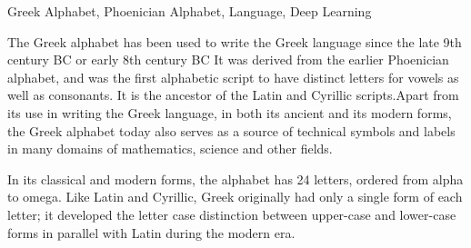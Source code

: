 \documentclass[doctor]{dutthesis} %
\begin{document}
\begin{englishabstract}{Greek Alphabet, Phoenician Alphabet, Language, Deep Learning}

The Greek alphabet has been used to write the Greek language since the late 9th
century BC or early 8th century BC It was derived from the earlier
Phoenician alphabet, and was the first alphabetic script to have distinct
letters for vowels as well as consonants. It is the ancestor of the Latin
and Cyrillic scripts.Apart from its use in writing the Greek language, in
both its ancient and its modern forms, the Greek alphabet today also serves
as a source of technical symbols and labels in many domains of mathematics,
science and other fields. \par
In its classical and modern forms, the alphabet has 24 letters, ordered from
alpha to omega. Like Latin and Cyrillic, Greek originally had only a single
form of each letter; it developed the letter case distinction between
upper-case and lower-case forms in parallel with Latin during the modern era.
\end{englishabstract}
\tableofcontents
\tableofengcontents
\cleardoublepage

\stcleardp


\end{document}
